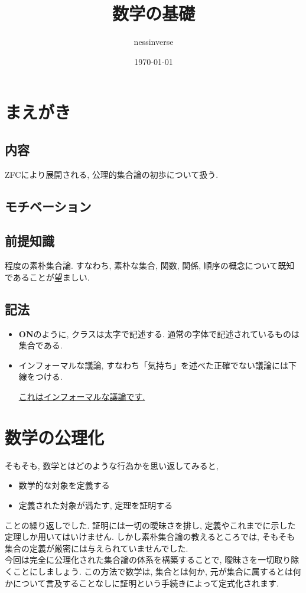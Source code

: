 \documentclass[a4paper]{bxjsarticle}
\title{数学の基礎}
\author{nessinverse}
\date{\today}
\theoremstyle{definition}
\begin{document}
    \maketitle
    
    \section*{まえがき}
    \subsection*{内容}
    ZFCにより展開される, 公理的集合論の初歩について扱う. 
    \subsection*{モチベーション}
    
    \subsection*{前提知識}
    \cite{matsuzaka}程度の素朴集合論. すなわち, 素朴な集合, 関数, 関係, 順序の概念について既知であることが望ましい.
    \subsection*{記法}
    \begin{itemize}
        \item \textbf{ON}のように, クラスは太字で記述する. 通常の字体で記述されているものは集合である.
        \item インフォーマルな議論, すなわち「気持ち」を述べた正確でない議論には下線をつける.
        
        \underline{これはインフォーマルな議論です.}
    \end{itemize}
    \newpage
    \tableofcontents
    \newpage    
    
    \section{数学の公理化}
    そもそも, 数学とはどのような行為かを思い返してみると,
    \begin{itemize}
        \item 数学的な対象を定義する
        \item 定義された対象が満たす, 定理を証明する
    \end{itemize}
    ことの繰り返しでした. 証明には一切の曖昧さを排し, 定義やこれまでに示した定理しか用いてはいけません. しかし素朴集合論の教えるところでは, そもそも集合の定義が厳密には与えられていませんでした.\\
    今回は完全に公理化された集合論の体系を構築することで, 曖昧さを一切取り除くことにしましょう. この方法で数学は, 集合とは何か, 元が集合に属するとは何かについて言及することなしに証明という手続きによって定式化されます.
    
\end{document}

